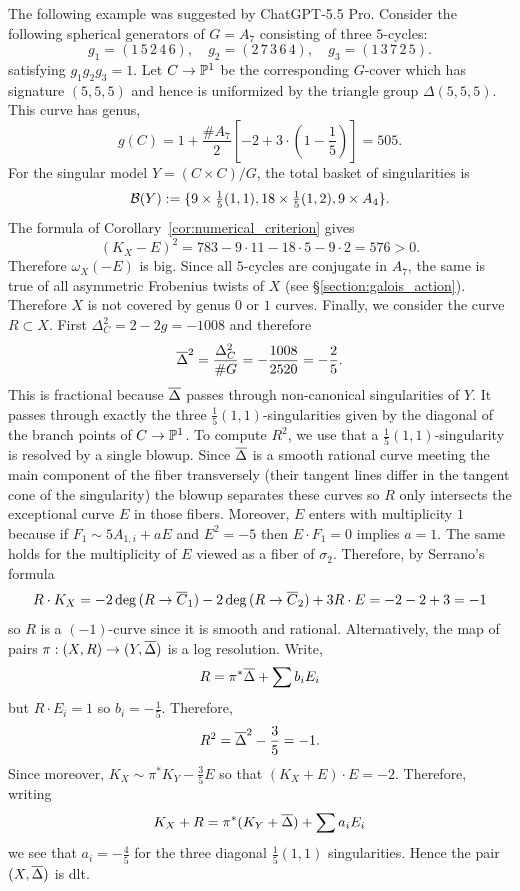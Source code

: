 \documentclass[main.tex]{subfiles}
\begin{document}
\begin{example}
The following example was suggested by ChatGPT-5.5 Pro. Consider the following spherical generators of $G = A_7$ consisting of three $5$-cycles:
\[ g_1 = (1 \, 5 \, 2 \, 4 \, 6), \quad g_2 = (2 \, 7\, 3\, 6\, 4), \quad g_3 = (1\, 3\, 7\, 2\, 5). \]
satisfying $g_1 g_2 g_3 = 1$. Let $C \to \P^1$ be the corresponding $G$-cover which has signature $(5,5,5)$ and hence is uniformized by the triangle group $\Delta(5,5,5)$. This curve has genus,
\[ g(C) = 1 + \frac{\# A_7}{2} \left[ -2 + 3 \cdot \left( 1 - \frac{1}{5} \right) \right] = 505. \]
For the singular model $Y = (C \times C)/G$, the total basket of singularities is
\[ \cB(Y) := \{ 9 \times \tfrac{1}{5}(1,1), 18 \times \tfrac{1}{5}(1,2), 9 \times A_4 \}. \]
The formula of Corollary~\ref{cor:numerical_criterion} gives
\[ (K_X - E)^2 = 783 - 9 \cdot 11 - 18 \cdot 5 - 9 \cdot 2 = 576 > 0. \]
Therefore $\omega_X(-E)$ is big. Since all $5$-cycles are conjugate in $A_7$, the same is true of all asymmetric Frobenius twists of $X$ (see \S\ref{section:galois_action}). Therefore $X$ is not covered by genus $0$ or $1$ curves. Finally, we consider the curve $R \subset X$. First $\Delta_{C}^2 = 2 - 2 g = -1008$ and therefore
\[ \ol{\Delta}^2 = \frac{\Delta_C^2}{\# G} = -\frac{1008}{2520} = -\frac{2}{5}. \]
This is fractional because $\ol{\Delta}$ passes through non-canonical singularities of $Y$. It passes through exactly the three $\frac{1}{5}(1,1)$-singularities given by the diagonal of the branch points of $C \to \P^1$.  To compute $R^2$, we use that a $\frac{1}{5}(1,1)$-singularity is resolved by a single blowup. Since $\ol{\Delta}$ is a smooth rational curve meeting the main component of the fiber transversely (their tangent lines differ in the tangent cone of the singularity) the blowup separates these curves so $R$ only intersects the exceptional curve $E$ in those fibers. Moreover, $E$ enters with multiplicity $1$ because if $F_1 \sim 5A_{1,i} + a E$ and $E^2 = -5$ then $E \cdot F_1 = 0$ implies $a = 1$. The same holds for the multiplicity of $E$ viewed as a fiber of $\sigma_2$. Therefore, by Serrano's formula
\[ R \cdot K_X = -2 \deg{(R \to \ol{C}_1)} - 2 \deg{(R \to \ol{C}_2)} + 3 R \cdot E =  -2 -2 + 3 = - 1 \]
so $R$ is a $(-1)$-curve since it is smooth and rational. Alternatively, the map of pairs $\pi : (X, R) \to (Y, \ol{\Delta})$ is a log resolution. Write,
\[ R = \pi^* \ol{\Delta} + \sum b_i E_i \]
but $R \cdot E_i = 1$ so $b_i = -\frac{1}{5}$. Therefore,
\[ R^2 = \ol{\Delta}^2 - \frac{3}{5} = - 1. \]
Since moreover, $K_X \sim \pi^* K_Y - \frac{3}{5} E$ so that $(K_X + E) \cdot E = -2$. Therefore, writing
\[ K_X + R = \pi^* (K_Y + \ol{\Delta}) + \sum a_i E_i \]
we see that $a_i = - \frac{4}{5}$ for the three diagonal $\frac{1}{5}(1,1)$ singularities. Hence the pair $(X, \ol{\Delta})$ is dlt. 
\end{example}
\end{document}
